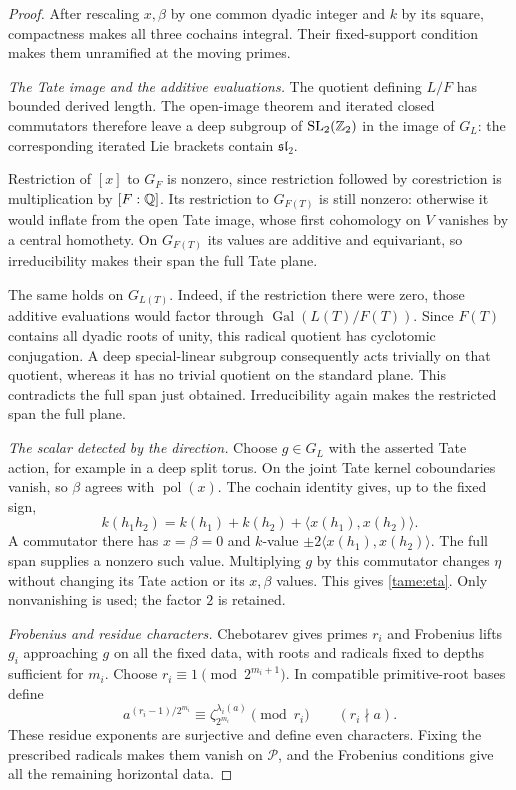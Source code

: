 \begin{proof}
After rescaling \(x,\beta\) by one common dyadic integer and \(k\)
by its square, compactness makes all three cochains integral. Their
fixed-support condition makes them unramified at the moving primes.

\emph{The Tate image and the additive evaluations.}
The quotient defining \(L/F\) has bounded derived length. The
open-image theorem and iterated closed commutators therefore leave
a deep subgroup of \(\mathrm{SL}_2(\mathbb Z_2)\) in the image of \(G_L\):
the corresponding iterated Lie brackets contain \(\mathfrak{sl}_2\).

Restriction of \([x]\) to \(G_F\) is nonzero, since restriction followed
by corestriction is multiplication by \([F:\mathbb Q]\). Its restriction to
\(G_{F(T)}\) is still nonzero: otherwise it would inflate from the open
Tate image, whose first cohomology on \(V\) vanishes by a central
homothety. On \(G_{F(T)}\) its values are additive and equivariant, so
irreducibility makes their span the full Tate plane.

The same holds on \(G_{L(T)}\). Indeed, if the restriction there were
zero, those additive evaluations would factor through
\(\operatorname{Gal}(L(T)/F(T))\). Since \(F(T)\) contains all dyadic
roots of unity, this radical quotient has cyclotomic conjugation.
A deep special-linear subgroup consequently acts trivially on that
quotient, whereas it has no trivial quotient on the standard plane.
This contradicts the full span just obtained. Irreducibility again
makes the restricted span the full plane.

\emph{The scalar detected by the direction.}
Choose \(g\in G_L\) with the asserted Tate action, for example in a
deep split torus. On the joint Tate kernel coboundaries vanish, so
\(\beta\) agrees with \(\operatorname{pol}(x)\). The cochain identity gives,
up to the fixed sign,
\[
 k(h_1h_2)=k(h_1)+k(h_2)+\langle x(h_1),x(h_2)\rangle.
\]
A commutator there has \(x=\beta=0\) and \(k\)-value
\(\pm2\langle x(h_1),x(h_2)\rangle\). The full span supplies a
nonzero such value. Multiplying \(g\) by this commutator changes
\(\eta\) without changing its Tate action or its \(x,\beta\) values.
This gives \eqref{tame:eta}. Only nonvanishing is used; the factor
\(2\) is retained.

\emph{Frobenius and residue characters.}
Chebotarev gives primes \(r_i\) and Frobenius lifts \(g_i\) approaching
\(g\) on all the fixed data, with roots and radicals fixed to depths
sufficient for \(m_i\). Choose \(r_i\equiv1\pmod{2^{m_i+1}}\).
In compatible primitive-root bases define
\begin{equation}\label{tame:residue-exponent}
 a^{(r_i-1)/2^{m_i}}\equiv
 \zeta_{2^{m_i}}^{\lambda_i(a)}\pmod{r_i}
 \qquad(r_i\nmid a).
\end{equation}
These residue exponents are surjective and define even characters.
Fixing the prescribed radicals makes them vanish on \(\mathcal P\),
and the Frobenius conditions give all the remaining horizontal data.
\end{proof}


